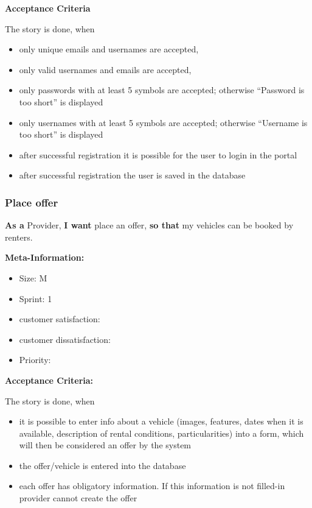 \textbf{Acceptance Criteria}

The story is done, when
\begin{itemize}
    \item only unique emails and usernames are accepted,
    \item only valid usernames and emails are accepted,
    \item only passwords with at least 5 symbols are accepted; otherwise “Password is too short” is displayed
    \item only usernames with at least 5 symbols are accepted; otherwise “Username is too short” is displayed
    \item after successful registration it is possible for the user to login in the portal
    \item after successful registration the user is saved in the database
\end{itemize}

\subsubsection{Place offer}

\textbf{As a} Provider,\hfill\break
\textbf{I want} place an offer,\hfill\break
\textbf{so that} my vehicles can be booked by renters.

\textbf{Meta-Information:}
\begin{itemize}
    \item Size: M
    \item Sprint: 1
    \item customer satisfaction:
    \item customer dissatisfaction:
    \item Priority:
\end{itemize}

\textbf{Acceptance Criteria:}

The story is done, when
\begin{itemize}
    \item it is possible to enter info about a vehicle (images, features, dates when it is available, description of rental conditions, particularities) into a form, which will then be considered an offer by the system
    \item the offer/vehicle is entered into the database
    \item each offer has obligatory information. If this information is not filled-in provider cannot create the offer
\end{itemize}

